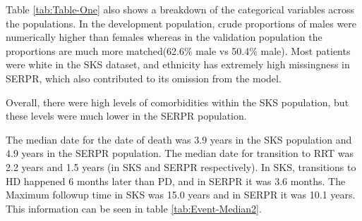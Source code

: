 \documentclass[
]{article}
\begin{document}
Table \ref{tab:Table-One} also shows a breakdown of the categorical variables across the populations. In the development population, crude proportions of males were numerically higher than females whereas in the validation population the proportions are much more matched(62.6\% male vs 50.4\% male). Most patients were white in the SKS dataset, and ethnicity has extremely high missingness in SERPR, which also contributed to its omission from the model.

Overall, there were high levels of comorbidities within the SKS population, but these levels were much lower in the SERPR population.

The median date for the date of death was 3.9 years in the SKS population and 4.9 years in the SERPR population. The median date for transition to RRT was 2.2 years and 1.5 years (in SKS and SERPR respectively). In SKS, transitions to HD happened 6 months later than PD, and in SERPR it was 3.6 months. The Maximum followup time in SKS was 15.0 years and in SERPR it was 10.1 years. This information can be seen in table \ref{tab:Event-Median2}.
\end{document}

